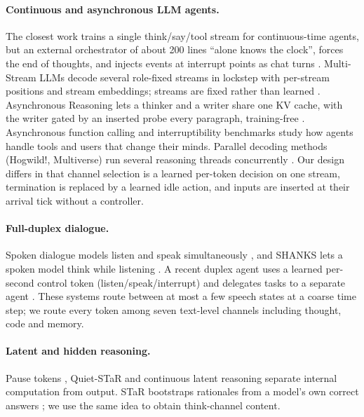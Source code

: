 \documentclass[10pt]{article}
\begin{document}
\paragraph{Continuous and asynchronous LLM agents.} The closest work trains a single think/say/tool stream for continuous-time agents, but an external orchestrator of about 200 lines ``alone knows the clock'', forces the end of thoughts, and injects events at interrupt points as chat turns \citep{li2026never}. Multi-Stream LLMs decode several role-fixed streams in lockstep with per-stream positions and stream embeddings; streams are fixed rather than learned \citep{su2026multistream}. Asynchronous Reasoning lets a thinker and a writer share one KV cache, with the writer gated by an inserted probe every paragraph, training-free \citep{yakushev2025asynchronous}. Asynchronous function calling \citep{gim2024asynclm,shi2026asynctool} and interruptibility benchmarks \citep{wu2025interruptible,zou2026users} study how agents handle tools and users that change their minds. Parallel decoding methods (Hogwild!, Multiverse) run several reasoning threads concurrently \citep{rodionov2025hogwild,yang2025multiverse}. Our design differs in that channel selection is a learned per-token decision on one stream, termination is replaced by a learned idle action, and inputs are inserted at their arrival tick without a controller.

\paragraph{Full-duplex dialogue.} Spoken dialogue models listen and speak simultaneously \citep{defossez2024moshi,veluri2024syncllm,ma2024lslm,zhang2024beyond}, and SHANKS lets a spoken model think while listening \citep{chiang2025shanks}. A recent duplex agent uses a learned per-second control token (listen/speak/interrupt) and delegates tasks to a separate agent \citep{orantqing2026gander}. These systems route between at most a few speech states at a coarse time step; we route every token among seven text-level channels including thought, code and memory.

\paragraph{Latent and hidden reasoning.} Pause tokens \citep{goyal2023pause}, Quiet-STaR \citep{zelikman2024quietstar} and continuous latent reasoning \citep{hao2024coconut} separate internal computation from output. STaR bootstraps rationales from a model's own correct answers \citep{zelikman2022star}; we use the same idea to obtain think-channel content.
\end{document}
